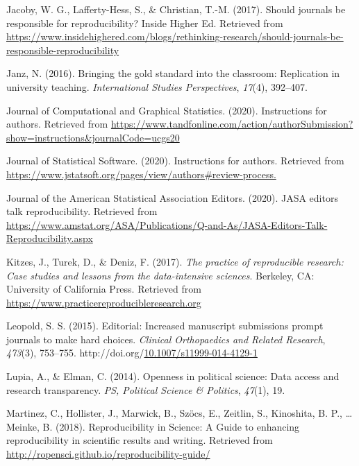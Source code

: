 \documentclass[12pt,twoside]{reedthesis}
\newenvironment{CSLReferences}%
  {}%
  {\par}
\begin{document}
\begin{CSLReferences}{1}{0}
\leavevmode\hypertarget{ref-higher-ed}{}%
Jacoby, W. G., Lafferty-Hess, S., \& Christian, T.-M. (2017). Should journals be responsible for reproducibility? Inside Higher Ed. Retrieved from \url{https://www.insidehighered.com/blogs/rethinking-research/should-journals-be-responsible-reproducibility}

\leavevmode\hypertarget{ref-janz2016bringing}{}%
Janz, N. (2016). Bringing the gold standard into the classroom: Replication in university teaching. \emph{International Studies Perspectives}, \emph{17}(4), 392--407.

\leavevmode\hypertarget{ref-jcgs-guide}{}%
Journal of Computational and Graphical Statistics. (2020). Instructions for authors. Retrieved from \url{https://www.tandfonline.com/action/authorSubmission?show=instructions\&journalCode=ucgs20}

\leavevmode\hypertarget{ref-jss-guide}{}%
Journal of Statistical Software. (2020). Instructions for authors. Retrieved from \url{https://www.jstatsoft.org/pages/view/authors\#review-process.}

\leavevmode\hypertarget{ref-jasa-rep-editors}{}%
Journal of the American Statistical Association Editors. (2020). JASA editors talk reproducibility. Retrieved from \url{https://www.amstat.org/ASA/Publications/Q-and-As/JASA-Editors-Talk-Reproducibility.aspx}

\leavevmode\hypertarget{ref-kitzes2017practice}{}%
Kitzes, J., Turek, D., \& Deniz, F. (2017). \emph{The practice of reproducible research: Case studies and lessons from the data-intensive sciences}. Berkeley, CA: University of California Press. Retrieved from \url{https://www.practicereproducibleresearch.org}

\leavevmode\hypertarget{ref-leopold2015increased}{}%
Leopold, S. S. (2015). Editorial: Increased manuscript submissions prompt journals to make hard choices. \emph{Clinical Orthopaedics and Related Research}, \emph{473}(3), 753--755. http://doi.org/\href{https://doi.org/10.1007/s11999-014-4129-1}{10.1007/s11999-014-4129-1}

\leavevmode\hypertarget{ref-lupia2014openness}{}%
Lupia, A., \& Elman, C. (2014). Openness in political science: Data access and research transparency. \emph{PS, Political Science \& Politics}, \emph{47}(1), 19.

\leavevmode\hypertarget{ref-r-opensci}{}%
Martinez, C., Hollister, J., Marwick, B., Szöcs, E., Zeitlin, S., Kinoshita, B. P., \ldots{} Meinke, B. (2018). {Reproducibility in Science: A Guide to enhancing reproducibility in scientific results and writing}. Retrieved from \url{http://ropensci.github.io/reproducibility-guide/}


\end{CSLReferences}
\end{document}
